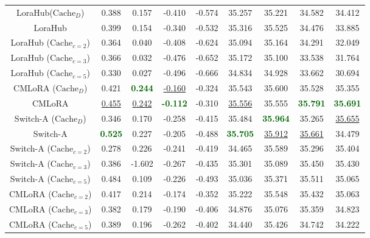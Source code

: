 \begin{table}[H]
\begin{center}
\begin{tabular}{c|cccc|cccc}
LoraHub($\text{Cache}_{D}$) & 0.388  & 0.157  & -0.410  & -0.574  & 35.257  & 35.221  & 34.582  & 34.412   \\
LoraHub & 0.399  & 0.154  & -0.340  & -0.532  & 35.316  & 35.525  & 34.476  & 33.885 \\
LoraHub ($\text{Cache}_{c=2}$)& 0.364  & 0.040  & -0.408  & -0.624  & 35.094  & 35.164   & 34.291  & 32.049 \\
LoraHub ($\text{Cache}_{c=3}$)& 0.366  & 0.032 & -0.476  & -0.652  & 35.172  & 35.100  & 33.538  & 31.764 \\
LoraHub ($\text{Cache}_{c=5}$)& 0.330  & 0.027  & -0.496  & -0.666  & 34.834  & 34.928  & 33.662  & 30.694 \\
\midrule
CMLoRA ($\text{Cache}_{D}$)& 0.421  & \textcolor{darkgreen}{\textbf{0.244}}  & \underline{-0.160}  & -0.324  & 35.543  & 35.600  & 35.528  & 35.355  \\
CMLoRA  & \underline{0.455}  & \underline{0.242} & \textcolor{darkgreen}{\textbf{-0.112}} & -0.310  & \underline{35.556}   & 35.555  & \textcolor{darkgreen}{\textbf{35.791}}  & \textcolor{darkgreen}{\textbf{35.691}}  \\
Switch-A ($\text{Cache}_{D}$) & 0.346 & 0.170  & -0.258 & -0.415 & 35.484  & \textcolor{darkgreen}{\textbf{35.964}}  & 35.265 & \underline{35.655}   \\
Switch-A & \textcolor{darkgreen}{\textbf{0.525}} & 0.227 & -0.205 & -0.488 & \textcolor{darkgreen}{\textbf{35.705}}  & \underline{35.912} & \underline{35.661} & 34.479  \\
Switch-A ($\text{Cache}_{c=2}$) & 0.278  & 0.226 & -0.241 & -0.419 & 34.465  & 35.589 & 35.296 & 35.404 \\
Switch-A ($\text{Cache}_{c=3}$) & 0.386  & -1.602 & -0.267 & -0.435 & 35.301 & 35.089 & 35.450 & 35.430  \\
Switch-A ($\text{Cache}_{c=5}$) & 0.484  & 0.109 & -0.226 & -0.493 & 35.036 & 35.371 & 35.511  & 35.065  \\
CMLoRA ($\text{Cache}_{c=2}$) & 0.417  & 0.214  & -0.174  & -0.352  & 35.222   & 35.548  & 35.432  & 35.063  \\
CMLoRA ($\text{Cache}_{c=3}$) & 0.382  & 0.179  & -0.190  & -0.406  & 34.876   & 35.076  & 35.359  & 34.823 \\
CMLoRA ($\text{Cache}_{c=5}$) & 0.389  & 0.196  & -0.262  & -0.402  & 34.440  & 35.426  & 34.742  & 34.222 \\
\bottomrule
\end{tabular}
\end{center}
\end{table}
